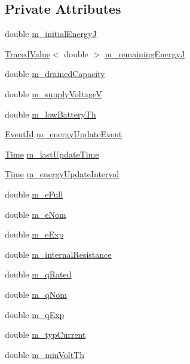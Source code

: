 \subsection*{Private Attributes}
\begin{DoxyCompactItemize}
\item 
double \hyperlink{classns3_1_1LiIonEnergySource_a576f4ff41033407b325d7b9274c8f646}{m\+\_\+initial\+EnergyJ}
\item 
\hyperlink{classns3_1_1TracedValue}{Traced\+Value}$<$ double $>$ \hyperlink{classns3_1_1LiIonEnergySource_a550b7c1858cc4a397290c5696eff4e3e}{m\+\_\+remaining\+EnergyJ}
\item 
double \hyperlink{classns3_1_1LiIonEnergySource_a185b1e4fc53512a50a8d3c4400877f2c}{m\+\_\+drained\+Capacity}
\item 
double \hyperlink{classns3_1_1LiIonEnergySource_a52a95a68d5ee4c420a207d00c2905eb2}{m\+\_\+supply\+VoltageV}
\item 
double \hyperlink{classns3_1_1LiIonEnergySource_a972d6f81d00be4fab50e1cb4fe057260}{m\+\_\+low\+Battery\+Th}
\item 
\hyperlink{classns3_1_1EventId}{Event\+Id} \hyperlink{classns3_1_1LiIonEnergySource_aa5c7c2460f252aa02e2473335bb582c1}{m\+\_\+energy\+Update\+Event}
\item 
\hyperlink{classns3_1_1Time}{Time} \hyperlink{classns3_1_1LiIonEnergySource_aff305a21b56ec669a64b5e0fa5d8d268}{m\+\_\+last\+Update\+Time}
\item 
\hyperlink{classns3_1_1Time}{Time} \hyperlink{classns3_1_1LiIonEnergySource_a7fbf4eff8a6ddf3731af34ed9f10a478}{m\+\_\+energy\+Update\+Interval}
\item 
double \hyperlink{classns3_1_1LiIonEnergySource_a658ba6ef9bee3e1ff7c1ec91ac3caaad}{m\+\_\+e\+Full}
\item 
double \hyperlink{classns3_1_1LiIonEnergySource_a95979850ba194e2492f911c2d6d39c19}{m\+\_\+e\+Nom}
\item 
double \hyperlink{classns3_1_1LiIonEnergySource_a9b4872a3e9793d43b01cf3656666c279}{m\+\_\+e\+Exp}
\item 
double \hyperlink{classns3_1_1LiIonEnergySource_a7c22bde6de9fb282e4517b45bbae31b9}{m\+\_\+internal\+Resistance}
\item 
double \hyperlink{classns3_1_1LiIonEnergySource_ae2dcf1fde731b0045ce2d93d13a00ebc}{m\+\_\+q\+Rated}
\item 
double \hyperlink{classns3_1_1LiIonEnergySource_acfca8f1da4a37a00286abf71685b6f3f}{m\+\_\+q\+Nom}
\item 
double \hyperlink{classns3_1_1LiIonEnergySource_ad1b19f7503ba9ad3c012303299d38c86}{m\+\_\+q\+Exp}
\item 
double \hyperlink{classns3_1_1LiIonEnergySource_af4e0f258f6a3a020eae2f695b1d0db9f}{m\+\_\+typ\+Current}
\item 
double \hyperlink{classns3_1_1LiIonEnergySource_a3970d4ceb2475f86f27343811ec6b9bc}{m\+\_\+min\+Volt\+Th}
\end{DoxyCompactItemize}
